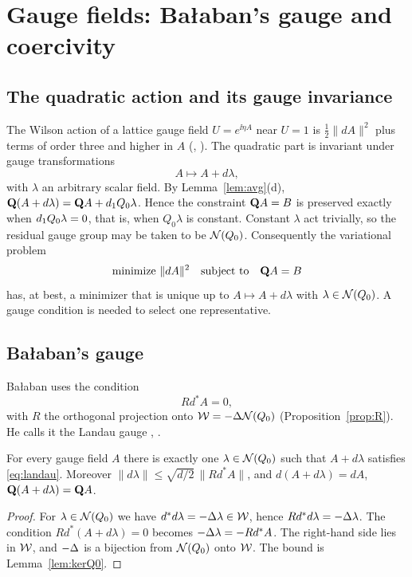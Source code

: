 \section{Gauge fields: \texorpdfstring{Ba\l aban}{Balaban}'s gauge and coercivity}\label{sec:gauge-coercivity}

\subsection{The quadratic action and its gauge invariance}\label{ss:9.1}

The Wilson action of a lattice gauge field $U=e^{\ii\eta A}$ near $U=1$ is $\frac12\|dA\|^2$ plus terms of order three and higher in $A$ (\cite[(1.3)]{BalPropI}, \cite[(26)]{BalVar}). The quadratic part is invariant under gauge transformations
\[
A\mapsto A+d\lambda,
\]
with $\lambda$ an arbitrary scalar field. By Lemma~\ref{lem:avg}(d), $\mathbf Q(A+d\lambda)=\mathbf Q A+d_1 Q_0\lambda$. Hence the constraint $\mathbf Q A=B$ is preserved exactly when $d_1 Q_0\lambda=0$, that is, when $Q_0\lambda$ is constant. Constant $\lambda$ act trivially, so the residual gauge group may be taken to be $\mathcal N(Q_0)$. Consequently the variational problem
\[
\text{minimize }\|dA\|^2\quad\text{subject to}\quad\mathbf Q A=B
\]
has, at best, a minimizer that is unique up to $A\mapsto A+d\lambda$ with $\lambda\in\mathcal N(Q_0)$. A gauge condition is needed to select one representative.

\subsection{\texorpdfstring{Ba\l aban}{Balaban}'s gauge}\label{ss:9.2}

Ba\l aban uses the condition
\begin{equation}\label{eq:landau}
Rd^*A=0,
\end{equation}
with $R$ the orthogonal projection onto $\mathcal W=-\Delta\mathcal N(Q_0)$ (Proposition~\ref{prop:R}). He calls it the Landau gauge \cite[Sect.~D]{BalPropI}, \cite[(21)]{BalVar}.

\begin{lemma}\label{lem:gauge-fix}
For every gauge field $A$ there is exactly one $\lambda\in\mathcal N(Q_0)$ such that $A+d\lambda$ satisfies \eqref{eq:landau}. Moreover $\|d\lambda\|\le\sqrt{d/2}\,\|Rd^*A\|$, and $d(A+d\lambda)=dA$, $\mathbf Q(A+d\lambda)=\mathbf Q A$.
\end{lemma}

\begin{proof}
For $\lambda\in\mathcal N(Q_0)$ we have $d^*d\lambda=-\Delta\lambda\in\mathcal W$, hence $Rd^*d\lambda=-\Delta\lambda$. The condition $Rd^*(A+d\lambda)=0$ becomes $-\Delta\lambda=-Rd^*A$. The right-hand side lies in $\mathcal W$, and $-\Delta$ is a bijection from $\mathcal N(Q_0)$ onto $\mathcal W$. The bound is Lemma~\ref{lem:kerQ0}.
\end{proof}

